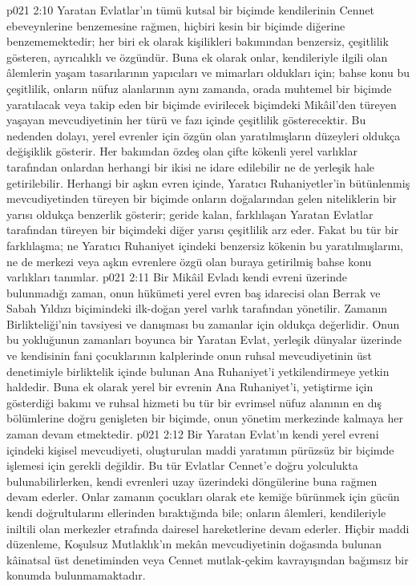 \vs p021 2:10 Yaratan Evlatlar’ın tümü kutsal bir biçimde kendilerinin Cennet ebeveynlerine benzemesine rağmen, hiçbiri kesin bir biçimde diğerine benzememektedir; her biri  ek olarak kişilikleri bakımından benzersiz, çeşitlilik gösteren, ayrıcalıklı ve özgündür. Buna ek olarak onlar, kendileriyle ilgili olan âlemlerin yaşam tasarılarının yapıcıları ve mimarları oldukları için; bahse konu bu çeşitlilik, onların nüfuz alanlarının aynı zamanda, orada muhtemel bir biçimde yaratılacak veya takip eden bir biçimde evirilecek biçimdeki Mikâil’den türeyen yaşayan mevcudiyetinin her türü ve fazı içinde çeşitlilik gösterecektir. Bu nedenden dolayı, yerel evrenler için özgün olan yaratılmışların düzeyleri oldukça değişiklik gösterir. Her bakımdan özdeş olan çifte kökenli yerel varlıklar tarafından onlardan herhangi bir ikisi ne idare edilebilir ne de yerleşik hale getirilebilir. Herhangi bir aşkın evren içinde, Yaratıcı Ruhaniyetler’in bütünlenmiş mevcudiyetinden türeyen bir biçimde onların doğalarından gelen niteliklerin bir yarısı oldukça benzerlik gösterir; geride kalan, farklılaşan Yaratan Evlatlar tarafından türeyen bir biçimdeki diğer yarısı çeşitlilik arz eder. Fakat bu tür bir farklılaşma; ne Yaratıcı Ruhaniyet içindeki benzersiz kökenin bu yaratılmışlarını, ne de merkezi veya aşkın evrenlere özgü olan buraya getirilmiş bahse konu varlıkları tanımlar.
\vs p021 2:11 Bir Mikâil Evladı kendi evreni üzerinde bulunmadığı zaman, onun hükümeti yerel evren baş idarecisi olan Berrak ve Sabah Yıldızı biçimindeki ilk\hyp{}doğan yerel varlık tarafından yönetilir. Zamanın Birlikteliği’nin tavsiyesi ve danışması bu zamanlar için oldukça değerlidir. Onun bu yokluğunun zamanları boyunca bir Yaratan Evlat, yerleşik dünyalar üzerinde ve kendisinin fani çocuklarının kalplerinde onun ruhsal mevcudiyetinin üst denetimiyle birliktelik içinde bulunan Ana Ruhaniyet’i yetkilendirmeye yetkin haldedir. Buna ek olarak yerel bir evrenin Ana Ruhaniyet’i, yetiştirme için gösterdiği bakımı ve ruhsal hizmeti bu tür bir evrimsel nüfuz alanının en dış bölümlerine doğru genişleten bir biçimde, onun yönetim merkezinde kalmaya her zaman devam etmektedir.
\vs p021 2:12 Bir Yaratan Evlat’ın kendi yerel evreni içindeki kişisel mevcudiyeti, oluşturulan maddi yaratımın pürüzsüz bir biçimde işlemesi için gerekli değildir. Bu tür Evlatlar Cennet’e doğru yolculukta bulunabilirlerken, kendi evrenleri uzay üzerindeki döngülerine buna rağmen devam ederler. Onlar zamanın çocukları olarak ete kemiğe bürünmek için gücün kendi doğrultularını ellerinden bıraktığında bile; onların âlemleri, kendileriyle iniltili olan merkezler etrafında dairesel hareketlerine devam ederler. Hiçbir maddi düzenleme, Koşulsuz Mutlaklık’ın mekân mevcudiyetinin doğasında bulunan kâinatsal üst denetiminden veya Cennet mutlak\hyp{}çekim kavrayışından bağımsız bir konumda bulunmamaktadır.

